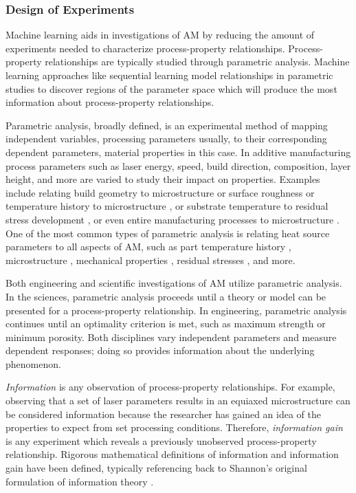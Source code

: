 \subsubsection{Design of Experiments}
Machine learning aids in investigations of AM by reducing the amount of experiments needed to characterize process-property relationships. Process-property relationships are typically studied through parametric analysis. Machine learning approaches like sequential learning model relationships in parametric studies to discover regions of the parameter space which will produce the most information about process-property relationships. 

Parametric analysis, broadly defined, is an experimental method of mapping independent variables, processing parameters usually, to their corresponding dependent parameters, material properties in this case. In additive manufacturing process parameters such as laser energy, speed, build direction, composition, layer height, and more are varied to study their impact on properties. Examples include relating build geometry to microstructure or surface roughness \cite{Antonysamy2013, Strano2013} or temperature history to microstructure \cite{Bontha2009, Nie2014}, or substrate temperature to residual stress development \cite{Chen2016, Brice2018}, or even entire manufacturing processes to microstructure \cite{Baufeld2011}. One of the most common types of parametric analysis is relating heat source parameters to all aspects of AM, such as part temperature history \cite{Bontha2006, Li2014}, microstructure \cite{Cherry2015, Jia2014}, mechanical properties \cite{Delgado2012, Khorasani2018}, residual stresses \cite{Wu2014, Denlinger2015}, and more.

Both engineering and scientific investigations of AM utilize parametric analysis. In the sciences, parametric analysis proceeds until a theory or model can be presented for a process-property relationship. In engineering, parametric analysis continues until an optimality criterion is met, such as maximum strength or minimum porosity. Both disciplines vary independent parameters and measure dependent responses; doing so provides information about the underlying phenomenon. 

\textit{Information} is any observation of process-property relationships. For example, observing that a set of laser parameters results in an equiaxed microstructure can be considered information because the researcher has gained an idea of the properties to expect from set processing conditions. Therefore, \textit{information gain} is any experiment which reveals a previously unobserved process-property relationship. Rigorous mathematical definitions of information and information gain have been defined, typically referencing back to Shannon's original formulation of information theory \cite{Shannon1948}.

